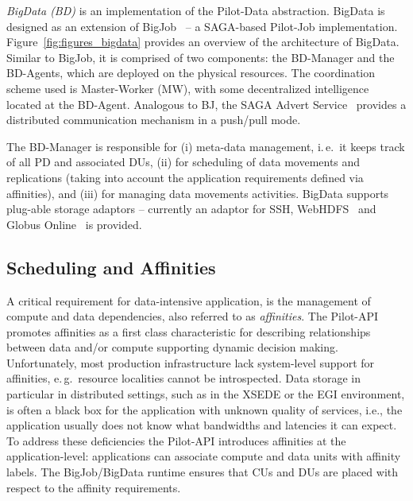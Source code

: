 \documentclass{sig-alternate}
\newcommand{\jhanote}[1]{ {\textcolor{red} { ***SJ: #1 }}}
\newcommand{\alnote}[1]{ {\textcolor{blue} { ***andreL: #1 }}}
\newcommand{\alnote}[1]{}
\newcommand{\jhanote}[1]{}
\newcommand{\upp}{\vspace*{-0.5em}}
\newcommand{\dus}{DUs\xspace}
\newcommand{\pd}{PD\xspace}
\begin{document}
{\it BigData (BD)} is an implementation of the Pilot-Data
abstraction. BigData is designed as an extension of 
BigJob~\cite{bigjob_web} -- a SAGA-based Pilot-Job implementation.
Figure~\ref{fig:figures_bigdata} provides an overview of the
architecture of BigData. Similar to BigJob, it is comprised of two
components: the BD-Manager and the BD-Agents, which are deployed on
the physical resources.  The coordination scheme used is Master-Worker
(MW), with some decentralized intelligence located at the BD-Agent.
Analogous to BJ, the SAGA Advert Service~\cite{saga_advert} 
provides a distributed communication mechanism in a push/pull mode.

The BD-Manager is responsible for (i) meta-data management, i.\,e.\ it
keeps track of all \pd and associated \dus, 
(ii) for scheduling of data movements and replications 
(taking into account the application requirements defined
via affinities), and (iii) for managing data movements activities. 
BigData supports plug-able storage adaptors -- currently an adaptor 
for SSH, WebHDFS~\cite{webhdfs} and Globus Online~\cite{10.1109/MIC.2011.64}
is provided. 


\upp
\subsection{Scheduling and Affinities}
\label{sec-affinities}

A critical requirement for data-intensive application, is the
management of compute and data dependencies, also referred to as {\it
  affinities}. The Pilot-API promotes affinities as a first class
characteristic for describing relationships between data and/or
compute supporting dynamic decision making.  Unfortunately, most
production infrastructure lack system-level support for affinities,
e.\,g.\ resource localities cannot be introspected. Data storage in
particular in distributed settings, such as in the XSEDE or the EGI
environment, is often a black box for the application with unknown
quality of services, i.e., the application usually does not know what
bandwidths and latencies it can expect. To address these deficiencies
the Pilot-API introduces affinities at the application-level:
applications can associate compute and data units with affinity
labels. The BigJob/BigData runtime ensures that CUs and DUs are placed
with respect to the affinity requirements.
\end{document}
